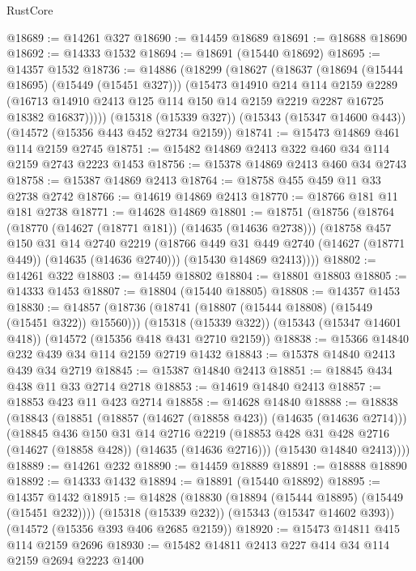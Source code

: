 \begin{lexlean}{RustCore}
\begin{coremodule}
@18689 := @14261 @327
@18690 := @14459 @18689
@18691 := @18688 @18690
@18692 := @14333 @1532
@18694 := @18691 (@15440 @18692)
@18695 := @14357 @1532
@18736 := @14886
    (@18299
      (@18627
        (@18637
          (@18694 (@15444 @18695) (@15449 (@15451 @327)))
          (@15473
            @14910
            @214
            @114
            @2159
            @2289
            (@16713 @14910 @2413 @125 @114 @150 @14 @2159 @2219 @2287 @16725 @18382 @16837)))))
    (@15318 (@15339 @327))
    (@15343 (@15347 @14600 @443))
    (@14572 (@15356 @443 @452 @2734 @2159))
@18741 := @15473 @14869 @461 @114 @2159 @2745
@18751 := @15482 @14869 @2413 @322 @460 @34 @114 @2159 @2743 @2223 @1453
@18756 := @15378 @14869 @2413 @460 @34 @2743
@18758 := @15387 @14869 @2413
@18764 := @18758 @455 @459 @11 @33 @2738 @2742
@18766 := @14619 @14869 @2413
@18770 := @18766 @181 @11 @181 @2738
@18771 := @14628 @14869
@18801 := @18751
    (@18756
      (@18764
        (@18770 (@14627 (@18771 @181)) (@14635 (@14636 @2738)))
        (@18758
          @457
          @150
          @31
          @14
          @2740
          @2219
          (@18766 @449 @31 @449 @2740 (@14627 (@18771 @449)) (@14635 (@14636 @2740)))
          (@15430 @14869 @2413))))
@18802 := @14261 @322
@18803 := @14459 @18802
@18804 := @18801 @18803
@18805 := @14333 @1453
@18807 := @18804 (@15440 @18805)
@18808 := @14357 @1453
@18830 := @14857
    (@18736 (@18741 (@18807 (@15444 @18808) (@15449 (@15451 @322)) @15560)))
    (@15318 (@15339 @322))
    (@15343 (@15347 @14601 @418))
    (@14572 (@15356 @418 @431 @2710 @2159))
@18838 := @15366 @14840 @232 @439 @34 @114 @2159 @2719 @1432
@18843 := @15378 @14840 @2413 @439 @34 @2719
@18845 := @15387 @14840 @2413
@18851 := @18845 @434 @438 @11 @33 @2714 @2718
@18853 := @14619 @14840 @2413
@18857 := @18853 @423 @11 @423 @2714
@18858 := @14628 @14840
@18888 := @18838
    (@18843
      (@18851
        (@18857 (@14627 (@18858 @423)) (@14635 (@14636 @2714)))
        (@18845
          @436
          @150
          @31
          @14
          @2716
          @2219
          (@18853 @428 @31 @428 @2716 (@14627 (@18858 @428)) (@14635 (@14636 @2716)))
          (@15430 @14840 @2413))))
@18889 := @14261 @232
@18890 := @14459 @18889
@18891 := @18888 @18890
@18892 := @14333 @1432
@18894 := @18891 (@15440 @18892)
@18895 := @14357 @1432
@18915 := @14828
    (@18830 (@18894 (@15444 @18895) (@15449 (@15451 @232))))
    (@15318 (@15339 @232))
    (@15343 (@15347 @14602 @393))
    (@14572 (@15356 @393 @406 @2685 @2159))
@18920 := @15473 @14811 @415 @114 @2159 @2696
@18930 := @15482 @14811 @2413 @227 @414 @34 @114 @2159 @2694 @2223 @1400

\end{coremodule}
\end{lexlean}
